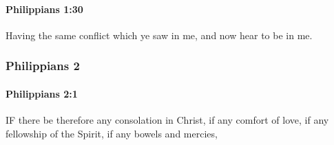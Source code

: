 		\paragraph{Philippians 1:30} %
			\label{PHILIPPIANS-1-30}

			Having the same conflict which ye saw in me, and now hear to be in me.

			\begin{framed}
			\scriptsize
				\begin{compactdesc}
					\item[SBLG] 
				\end{compactdesc}
			\end{framed}

	\subsubsection{Philippians 2} %
		\label{PHILIPPIANS-2}
		
		\paragraph{Philippians 2:1} %
			\label{PHILIPPIANS-2-1}

			IF there be therefore any consolation in Christ, if any comfort of love, if any fellowship of the Spirit, if any bowels and mercies,

